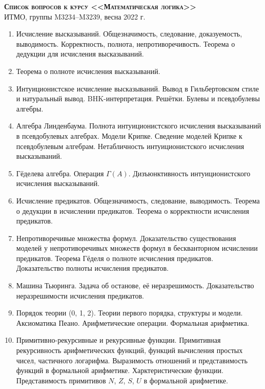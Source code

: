 \documentclass[11pt,a4paper,oneside]{scrartcl}
\begin{document}
\pagestyle{empty}

\begin{center}
{\large\scshape\bfseries Список вопросов к курсу <<Математическая логика>>}\\
ИТМО, группы M3234--M3239, весна 2022 г.
\end{center}


\begin{enumerate}
\item Исчисление высказываний. Общезначимость, следование, доказуемость, выводимость. Корректность, полнота, непротиворечивость.
Теорема о дедукции для исчисления высказываний. 
\item Теорема о полноте исчисления высказываний.
\item Интуиционистское исчисление высказываний. Вывод в Гильбертовском стиле и натуральный вывод.
BHK-интерпретация. Решётки. Булевы и псевдобулевы алгебры.
\item Алгебра Линденбаума. Полнота интуиционистского исчисления высказываний в псевдобулевых алгебрах.
Модели Крипке. Сведение моделей Крипке к псевдобулевым алгебрам. Нетабличность 
интуиционистского исчисления высказываний.
\item Гёделева алгебра. Операция $\Gamma(A)$. Дизъюнктивность интуиционистского исчисления высказываний.
\item Исчисление предикатов. Общезначимость, следование, выводимость. Теорема о дедукции в исчислении предикатов.
Теорема о корректности исчисления предикатов.
\item Непротиворечивые множества формул. Доказательство существования моделей у непротиворечивых множеств формул 
в бескванторном исчислении предикатов.
Теорема Гёделя о полноте исчисления предикатов. Доказательство полноты исчисления предикатов.
\item Машина Тьюринга. Задача об останове, её неразрешимость. Доказательство неразрешимости исчисления предикатов.
\item Порядок теории (0, 1, 2). Теории первого порядка, структуры и модели. Аксиоматика Пеано. Арифметические операции. Формальная арифметика. 
\item Примитивно-рекурсивные и рекурсивные функции. Примитивная рекурсивность 
арифметических функций, функций вычисления простых чисел, частичного логарифма.
Выразимость отношений и представимость функций в формальной арифметике. Харктеристические функции.
Представимость примитивов $N$, $Z$, $S$, $U$ в формальной арифметике.

\end{enumerate}
\end{document}

